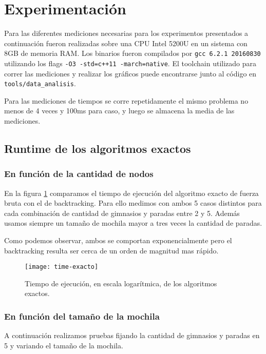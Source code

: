\section{Experimentación}

Para las diferentes mediciones necesarias para los experimentos presentados a continuación fueron realizadas sobre una CPU Intel 5200U en un sistema con 8GB de memoria RAM. Los binarios fueron compilados por \texttt{gcc 6.2.1 20160830} utilizando los flags \texttt{-O3 -std=c++11 -march=native}. El toolchain utilizado para correr las mediciones y realizar los gráficos puede encontrarse junto al código en \texttt{tools/data_analisis}.

Para las mediciones de tiempos se corre repetidamente el mismo problema no menos de 4 veces y 100ms para caso, y luego se almacena la media de las mediciones.

\subsection{Runtime de los algoritmos exactos}

\subsubsection{En función de la cantidad de nodos}

En la figura \ref{fig:time-exacto} comparamos el tiempo de ejecución del algoritmo exacto de fuerza bruta con el de backtracking.
Para ello medimos con ambos 5 casos distintos para cada combinación de cantidad de gimnasios y paradas entre 2 y 5. Además usamos siempre un tamaño de mochila mayor a tres veces la cantidad de paradas.

Como podemos observar, ambos se comportan exponencialmente pero el backtracking resulta ser cerca de un orden de magnitud mas rápido.

\begin{figure}[H]
    \centering
    \texttt{[image: time-exacto]}
    \caption{Tiempo de ejecución, en escala logarítmica, de los algoritmos exactos.}
    \label{fig:time-exacto}
\end{figure}

\subsubsection{En función del tamaño de la mochila}

A continuación realizamos pruebas fijando la cantidad de gimnasios y paradas en 5 y variando el tamaño de la mochila.

